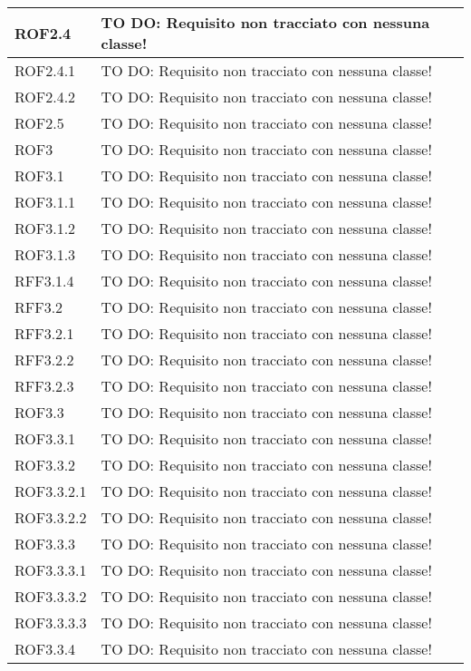 \begin{center}
\begin{longtable}{| p{4cm} | p{8cm} |}
\hline
ROF2.4 & TO DO: Requisito non tracciato con nessuna classe! \\
\hline
ROF2.4.1 & TO DO: Requisito non tracciato con nessuna classe! \\
\hline
ROF2.4.2 & TO DO: Requisito non tracciato con nessuna classe! \\
\hline
ROF2.5 & TO DO: Requisito non tracciato con nessuna classe! \\
\hline
ROF3 & TO DO: Requisito non tracciato con nessuna classe! \\
\hline
ROF3.1 & TO DO: Requisito non tracciato con nessuna classe! \\
\hline
ROF3.1.1 & TO DO: Requisito non tracciato con nessuna classe! \\
\hline
ROF3.1.2 & TO DO: Requisito non tracciato con nessuna classe! \\
\hline
ROF3.1.3 & TO DO: Requisito non tracciato con nessuna classe! \\
\hline
RFF3.1.4 & TO DO: Requisito non tracciato con nessuna classe! \\
\hline
RFF3.2 & TO DO: Requisito non tracciato con nessuna classe! \\
\hline
RFF3.2.1 & TO DO: Requisito non tracciato con nessuna classe! \\
\hline
RFF3.2.2 & TO DO: Requisito non tracciato con nessuna classe! \\
\hline
RFF3.2.3 & TO DO: Requisito non tracciato con nessuna classe! \\
\hline
ROF3.3 & TO DO: Requisito non tracciato con nessuna classe! \\
\hline
ROF3.3.1 & TO DO: Requisito non tracciato con nessuna classe! \\
\hline
ROF3.3.2 & TO DO: Requisito non tracciato con nessuna classe! \\
\hline
ROF3.3.2.1 & TO DO: Requisito non tracciato con nessuna classe! \\
\hline
ROF3.3.2.2 & TO DO: Requisito non tracciato con nessuna classe! \\
\hline
ROF3.3.3 & TO DO: Requisito non tracciato con nessuna classe! \\
\hline
ROF3.3.3.1 & TO DO: Requisito non tracciato con nessuna classe! \\
\hline
ROF3.3.3.2 & TO DO: Requisito non tracciato con nessuna classe! \\
\hline
ROF3.3.3.3 & TO DO: Requisito non tracciato con nessuna classe! \\
\hline
ROF3.3.4 & TO DO: Requisito non tracciato con nessuna classe! \\

\end{longtable}
\end{center}
